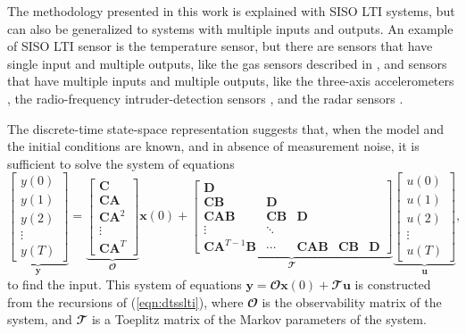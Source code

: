 The methodology presented in this work is explained with SISO LTI systems, but can also be generalized to systems with multiple inputs and outputs.
An example of SISO LTI sensor is the temperature sensor, but there are sensors that have single input and multiple outputs, like the gas sensors described in \citep{Munther19}, and sensors that have multiple inputs and multiple outputs, like the three-axis accelerometers \citep{DEmilia16}, the radio-frequency intruder-detection sensors \citep{Ushiki13}, and the radar sensors \citep{Kueppers17}. 

The discrete-time state-space representation suggests that, when the model and the initial conditions are known, and in absence of measurement noise, it is sufficient to solve the system of equations 
\begin{equation} 
\underbrace{ \begin{bmatrix} y(0) \\ y(1) \\ y(2) \\ \vdots \\ y(T) \end{bmatrix} }_{\mathbf{y}}
 = \underbrace{ \begin{bmatrix} \mathbf{C} \\ \mathbf{C} \mathbf{A} \\ \mathbf{C} \mathbf{A}^2 \\ \vdots \\ \mathbf{C} \mathbf{A}^T \end{bmatrix} }_{\mathbfcal{O}} \mathbf{x}(0) +
 \underbrace{ \begin{bmatrix} \mathbf{D} \\ \mathbf{C} \mathbf{B} & \mathbf{D} \\ \mathbf{C} \mathbf{A} \mathbf{B} & \mathbf{C} \mathbf{B} & \mathbf{D} \\ \vdots & \ddots \\ \mathbf{C} \mathbf{A}^{T-1} \mathbf{B} & \cdots  &  \mathbf{C} \mathbf{A} \mathbf{B} & \mathbf{C} \mathbf{B} & \mathbf{D} \end{bmatrix} }_{\mathbfcal{T}} \underbrace{ \begin{bmatrix} u(0) \\ u(1) \\ u(2) \\ \vdots \\ u(T) \end{bmatrix} }_{\mathbf{u}} ,
 \label{eqn:knownmodel} \end{equation}
to find the input. 
This system of equations $\mathbf{y} = \mathbfcal{O} \mathbf{x}(0) + \mathbfcal{T} \mathbf{u}$ is constructed from the recursions of (\ref{eqn:dtsslti}), where $\mathbfcal{O}$ is the observability matrix of the system, and $\mathbfcal{T}$ is a Toeplitz matrix of the Markov parameters of the system.

